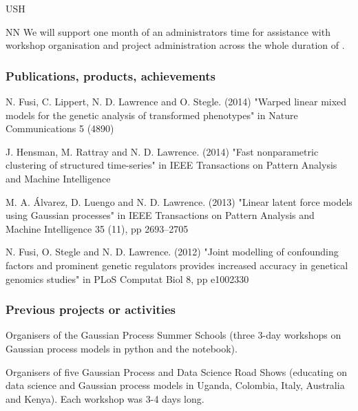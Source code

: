 \begin{sitedescription}{USH}

%



\begin{participant}[type=res,PM=1]{NN}
  We will support one month of an administrators time for assistance
  with workshop organisation and project administration across the
  whole duration of \TheProject.
\end{participant}


%

\subsubsection*{Publications, products, achievements}

\begin{compactenum}
\item N. Fusi, C. Lippert, N. D. Lawrence and O. Stegle. (2014) "Warped linear mixed models for the genetic analysis of transformed phenotypes" in Nature Communications 5 (4890)
\item J. Hensman, M. Rattray and N. D. Lawrence. (2014) "Fast nonparametric clustering of structured time-series" in IEEE Transactions on Pattern Analysis and Machine Intelligence
\item M. A. \'Alvarez, D. Luengo and N. D. Lawrence. (2013) "Linear latent force models using Gaussian processes" in IEEE Transactions on Pattern Analysis and Machine Intelligence 35 (11), pp 2693--2705
\item N. Fusi, O. Stegle and N. D. Lawrence. (2012) "Joint modelling of confounding factors and prominent genetic regulators provides increased accuracy in genetical genomics studies" in PLoS Computat Biol 8, pp e1002330
\end{compactenum}

\subsubsection*{Previous projects or activities}

\begin{compactenum}
\item Organisers of the Gaussian Process Summer Schools (three 3-day workshops on Gaussian process models in python and the \IPython notebook).
\item Organisers of five Gaussian Process and Data Science Road Shows (educating on data science and Gaussian process models in Uganda, Colombia, Italy, Australia and Kenya). Each workshop was 3-4 days long.
\end{compactenum}


\end{sitedescription}
